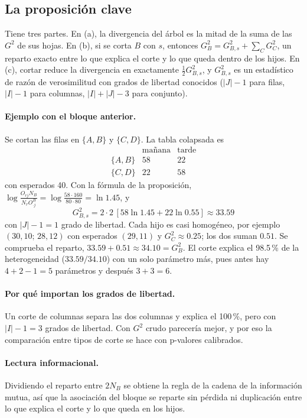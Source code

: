 \documentclass[11pt,a4paper]{article}
\begin{document}
\subsection{La proposición clave}

Tiene tres partes. En (a), la divergencia del árbol es la mitad de la suma de las
$G^2$ de sus hojas. En (b), si se corta $B$ con $s$, entonces
$G^2_B=G^2_{B,s}+\sum_{C}G^2_C$, un reparto exacto entre lo que explica el corte y
lo que queda dentro de los hijos. En (c), cortar reduce la divergencia en
exactamente $\tfrac12G^2_{B,s}$, y $G^2_{B,s}$ es un estadístico de razón de
verosimilitud con grados de libertad conocidos ($|J|-1$ para filas, $|I|-1$ para
columnas, $|I|+|J|-3$ para conjunto).

\paragraph{Ejemplo con el bloque anterior.} Se cortan las filas en $\{A,B\}$ y
$\{C,D\}$. La tabla colapsada es
\[
\begin{array}{c|cc}
 & \text{mañana} & \text{tarde}\\\hline
\{A,B\} & 58 & 22\\ \{C,D\} & 22 & 58
\end{array}
\]
con esperados 40. Con la fórmula de la proposición,
$\log\frac{O_{rj}N_B}{N_rO^B_{\cdot j}}=\log\frac{58\cdot160}{80\cdot80}=\ln1.45$,
y
\[
G^2_{B,s}=2\cdot2\,[58\ln1.45+22\ln0.55]\approx 33.59
\]
con $|J|-1=1$ grado de libertad. Cada hijo es casi homogéneo, por ejemplo
$(30,10;\,28,12)$ con esperados $(29,11)$ y $G^2_C\approx0.25$; los dos suman
$0.51$. Se comprueba el reparto, $33.59+0.51\approx34.10=G^2_B$. El corte explica el
98.5\,\% de la heterogeneidad ($33.59/34.10$) con un solo parámetro más, pues
antes hay $4+2-1=5$ parámetros y después $3+3=6$.

\paragraph{Por qué importan los grados de libertad.} Un corte de columnas separa
las dos columnas y explica el 100\,\%, pero con $|I|-1=3$ grados de libertad.
Con $G^2$ crudo parecería mejor, y por eso la comparación entre tipos de corte se
hace con p-valores calibrados.

\paragraph{Lectura informacional.} Dividiendo el reparto entre $2N_B$ se obtiene la
regla de la cadena de la información mutua, así que la asociación del bloque se
reparte sin pérdida ni duplicación entre lo que explica el corte y lo que queda en
los hijos.
\end{document}
